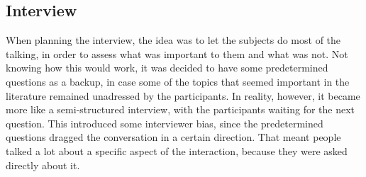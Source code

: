 \subsection{Interview}
When planning the interview, the idea was to let the subjects do most of the talking, in order to assess what was important to them and what was not. Not knowing how this would work, it was decided to have some predetermined questions as a backup, in case some of the topics that seemed important in the literature remained unadressed by the participants. In reality, however, it became more like a semi-structured interview, with the participants waiting for the next question. This introduced some interviewer bias, since the predetermined questions dragged the conversation in a certain direction. That meant people talked a lot about a specific aspect of the interaction, because they were asked directly about it.